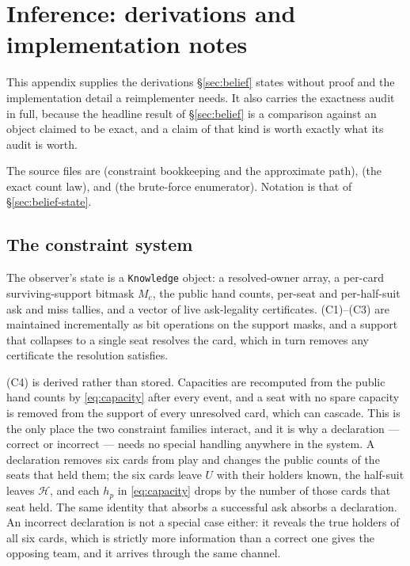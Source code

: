 \section{Inference: derivations and implementation notes}
\label{app:inference}

This appendix supplies the derivations \S\ref{sec:belief} states without proof
and the implementation detail a reimplementer needs. It also carries the
exactness audit in full, because the headline result of \S\ref{sec:belief} is a
comparison against an object claimed to be exact, and a claim of that kind is
worth exactly what its audit is worth.

The source files are  (constraint bookkeeping and
the approximate path),  (the exact count law),
and  (the brute-force enumerator). Notation is
that of \S\ref{sec:belief-state}.

\subsection{The constraint system}
\label{app:inf-constraints}

The observer's state is a \texttt{Knowledge} object: a resolved-owner array, a
per-card surviving-support bitmask $M_c$, the public hand counts, per-seat and
per-half-suit ask and miss tallies, and a vector of live ask-legality
certificates. (C1)--(C3) are maintained incrementally as bit operations on the
support masks, and a support that collapses to a single seat resolves the card,
which in turn removes any certificate the resolution satisfies.

(C4) is derived rather than stored. Capacities are recomputed from the public
hand counts by \eqref{eq:capacity} after every event, and a seat with no spare
capacity is removed from the support of every unresolved card, which can cascade.
This is the only place the two constraint families interact, and it is why a
declaration --- correct or incorrect --- needs no special handling anywhere in
the system. A declaration removes six cards from play and changes the public
counts of the seats that held them; the six cards leave $U$ with their holders
known, the half-suit leaves $\mathcal{H}$, and each $h_p$ in
\eqref{eq:capacity} drops by the number of those cards that seat held. The same
identity that absorbs a successful ask absorbs a declaration. An incorrect
declaration is not a special case either: it reveals the true holders of all six
cards, which is strictly more information than a correct one gives the opposing
team, and it arrives through the same channel.

